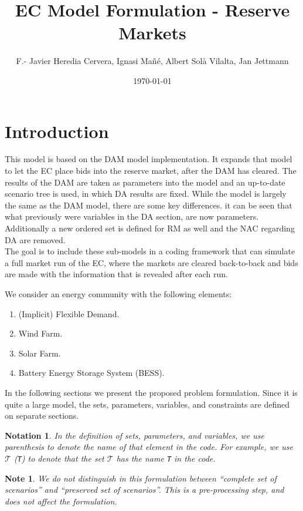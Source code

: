 \documentclass{article}
\title{EC Model Formulation - Reserve Markets}
\author{F.- Javier Heredia Cervera, Ignasi Mañé, Albert Sol\`a Vilalta, Jan Jettmann}
\date{\today}
\newtheorem{notation}{Notation}[section]
\newtheorem{note}{Note}[section]
\begin{document}
\maketitle

\section{Introduction}

This model is based on the DAM model implementation. It expands that model to let the EC place bids into the reserve market, after the DAM has cleared. The results of the DAM are taken as parameters into the model and an up-to-date scenario tree is used, in which DA results are fixed. While the model is largely the same as the DAM model, there are some key differences. it can be seen that what previously were variables in the DA section, are now parameters. Additionally a new ordered set is defined for RM as well and the NAC regarding DA are removed.\\
The goal is to include these sub-models in a coding framework that can simulate a full market run of the EC, where the markets are cleared back-to-back and bids are made with the information that is revealed after each run.

We consider an energy community with the following elements:
\begin{enumerate}
	\item (Implicit) Flexible Demand.
	\item Wind Farm.
	\item Solar Farm.
	\item Battery Energy Storage System (BESS).
\end{enumerate}

In the following sections we present the proposed problem formulation. Since it is quite a large model, the sets, parameters, variables, and constraints are defined on separate sections.

\begin{notation}
	In the definition of sets, parameters, and variables, we use parenthesis to denote the name of that element in the code. For example, we use $\mathcal{T}$ (\verb|T|) to denote that the set $\mathcal{T}$ has the name \verb|T| in the code.  
\end{notation}

\begin{note} \label{NOTE:ScenarioTreatment}
	We do not distinguish in this formulation between ``complete set of scenarios'' and ``preserved set of scenarios''. This is a pre-processing step, and does not affect the formulation. 
\end{note}
\end{document}
